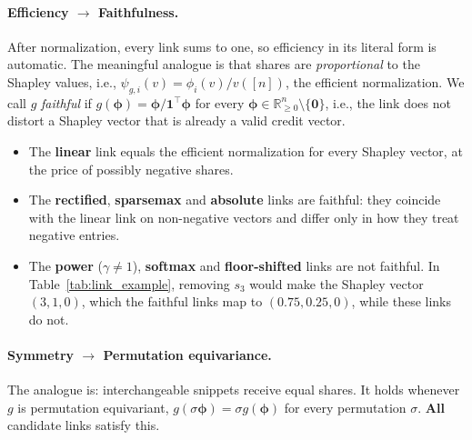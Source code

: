 \documentclass{article}
\begin{document}
\paragraph{Efficiency $\to$ Faithfulness.}
After normalization, every link sums to one, so efficiency in its literal form is automatic. The meaningful analogue is that shares are \emph{proportional} to the Shapley values, i.e., $\psi_{g,i}(v) = \phi_i(v) / v([n])$, the efficient normalization. We call $g$ \emph{faithful} if $g(\boldsymbol{\phi}) = \boldsymbol{\phi} / \mathbf{1}^\top \boldsymbol{\phi}$ for every $\boldsymbol{\phi} \in \mathbb{R}^n_{\ge 0} \setminus \{\mathbf{0}\}$, i.e., the link does not distort a Shapley vector that is already a valid credit vector.
\begin{itemize}
    \item The \textbf{linear} link equals the efficient normalization for every Shapley vector, at the price of possibly negative shares.
    \item The \textbf{rectified}, \textbf{sparsemax} and \textbf{absolute} links are faithful: they coincide with the linear link on non-negative vectors and differ only in how they treat negative entries.
    \item The \textbf{power} ($\gamma \neq 1$), \textbf{softmax} and \textbf{floor-shifted} links are not faithful. In Table~\ref{tab:link_example}, removing $s_3$ would make the Shapley vector $(3, 1, 0)$, which the faithful links map to $(0.75, 0.25, 0)$, while these links do not.
\end{itemize}

\paragraph{Symmetry $\to$ Permutation equivariance.}
The analogue is: interchangeable snippets receive equal shares. It holds whenever $g$ is permutation equivariant, $g(\sigma \boldsymbol{\phi}) = \sigma g(\boldsymbol{\phi})$ for every permutation $\sigma$. \textbf{All} candidate links satisfy this.
\end{document}
